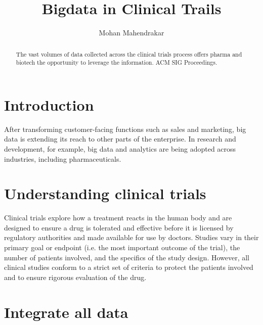 \documentclass[sigconf]{acmart}
\begin{document}
\title{Bigdata in Clinical Trails}


\author{Mohan Mahendrakar}

\renewcommand{\shortauthors}{B. Trovato et al.}


\begin{abstract}
The vast volumes of data collected across the clinical trials process offers pharma and biotech 
the opportunity to leverage the information.
ACM SIG Proceedings.
\end{abstract}



\maketitle

\section{Introduction}

After transforming customer-facing functions such as sales and marketing, big data is extending its reach to other parts of the enterprise. In research and development, for example, big data and analytics are being adopted across industries, including pharmaceuticals.

\section{Understanding clinical trials}
Clinical trials explore how a treatment reacts in the human body and are designed to
ensure a drug is tolerated and effective before it is licensed by regulatory authorities
and made available for use by doctors. Studies vary in their primary goal or endpoint
(i.e. the most important outcome of the trial), the number of patients involved, and the
specifics of the study design. However, all clinical studies conform to a strict set of
criteria to protect the patients involved and to ensure rigorous evaluation of the drug.

\section{Integrate all data}
\end{document}
